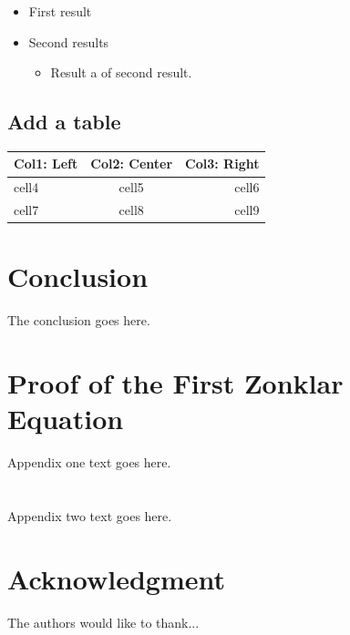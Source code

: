 \documentclass[journal,onecolumn,twoside]{IEEEtran}
\begin{document}
\begin{itemize}
    \item First result
    \item Second results
    \begin{itemize}
        \item Result a of second result.
    \end{itemize}
\end{itemize}

\subsection{Add a table}

\begin{center}
\begin{tabular}{ |l|c|r| }
 \hline
 \textbf{Col1: Left} & Col2: Center & Col3: Right \\ \hline
 cell4 & cell5 & cell6 \\ \hline
 cell7 & cell8 & cell9 \\ 
 \hline
\end{tabular}
\end{center}



\section{Conclusion}
The conclusion goes here.



\appendices
\section{Proof of the First Zonklar Equation}
Appendix one text goes here.

\section{}
Appendix two text goes here.


\section*{Acknowledgment}


The authors would like to thank...


\ifCLASSOPTIONcaptionsoff
  \newpage
\fi
\end{document}
